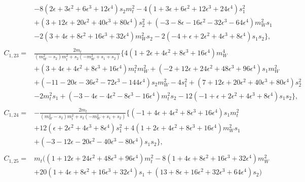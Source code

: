 \documentclass[twocolumn,aps,showpacs,nofootinbib,superscriptaddress,prd]{revtex4-2}
\begin{document}
\begin{widetext}
\begin{align}
\nonumber\\&
-8\left(2\epsilon+3\epsilon^2+6\epsilon^3+12\epsilon^4\right)s_2m_t^2-4\left(1 +3 \epsilon +6 \epsilon^2 +12 \epsilon^3 +24 \epsilon^4\right)s_1^2
\nonumber\\&
+\left(3 +12 \epsilon +20 \epsilon^2 +40 \epsilon^3 +80 \epsilon^4\right)s_2^2+\left(-3 -8 \epsilon -16 \epsilon^2 -32 \epsilon^3 -64 \epsilon^4\right)m_W^2s_1
\nonumber\\&
-2\left(3 +4 \epsilon +8 \epsilon^2 +16 \epsilon^3 +32 \epsilon^4\right)m_W^2s_2-2\left(-4 +\epsilon +2 \epsilon^2 +4 \epsilon^3 +8 \epsilon^4\right)s_1s_2\}
,\nonumber\\
\nonumber\\
C_{1,23}=&\frac{2m_t}{\left(m_W^2-s_2\right)m_t^2+s_2\left(-m_W^2+s_1+s_2\right)}\{4\left(1 +2 \epsilon +4 \epsilon^2 +8 \epsilon^3 +16 \epsilon^4\right)m_W^4
\nonumber\\&
+\left(3 +4 \epsilon +4 \epsilon^2 +8 \epsilon^3 +16 \epsilon^4\right)m_t^2m_W^2+\left(-2 +12 \epsilon +24 \epsilon^2 +48 \epsilon^3 +96 \epsilon^4\right)s_1m_W^2
\nonumber\\&
+\left(-11 -20 \epsilon -36 \epsilon^2 -72 \epsilon^3 -144 \epsilon^4\right)s_2m_W^2-4s_1^2+\left(7 +12 \epsilon +20 \epsilon^2 +40 \epsilon^3 +80 \epsilon^4\right)s_2^2
\nonumber\\&
-2m_t^2s_1+\left(-3 -4 \epsilon -4 \epsilon^2 -8 \epsilon^3 -16 \epsilon^4\right)m_t^2s_2-12\left(-1 +\epsilon +2 \epsilon^2 +4 \epsilon^3 +8 \epsilon^4\right)s_1s_2\}
,\nonumber\\
\nonumber\\
C_{1,24}=&-\frac{2m_t}{\left(m_W^2-s_2\right)m_t^2+s_2\left(-m_W^2+s_1+s_2\right)}\{\left(-1 +4 \epsilon +4 \epsilon^2 +8 \epsilon^3 +16 \epsilon^4\right)s_1m_t^2
\nonumber\\&
+12\left(\epsilon +2 \epsilon^2 +4 \epsilon^3 +8 \epsilon^4\right)s_1^2+4\left(1 +2 \epsilon +4 \epsilon^2 +8 \epsilon^3 +16 \epsilon^4\right)m_W^2s_1
\nonumber\\&
+\left(-3 -12 \epsilon -20 \epsilon^2 -40 \epsilon^3 -80 \epsilon^4\right)s_1s_2\}
,\nonumber\\
\nonumber\\
C_{1,25}=&m_t(\left(1 +12 \epsilon +24 \epsilon^2 +48 \epsilon^3 +96 \epsilon^4\right)m_t^2-8\left(1 +4 \epsilon +8 \epsilon^2 +16 \epsilon^3 +32 \epsilon^4\right)m_W^2
\nonumber\\&
+20\left(1 +4 \epsilon +8 \epsilon^2 +16 \epsilon^3 +32 \epsilon^4\right)s_1+\left(13 +8 \epsilon +16 \epsilon^2 +32 \epsilon^3 +64 \epsilon^4\right)s_2)

\end{align}
\end{widetext}
\end{document}
